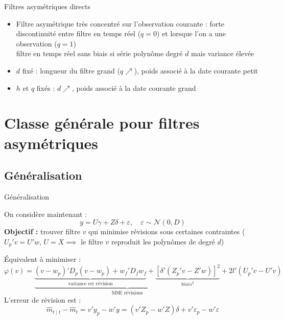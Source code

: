 \documentclass[10pt,xcolor=table,color={dvipsnames,usenames},ignorenonframetext,usepdftitle=false,french]{beamer}
\begin{document}
\begin{frame}{Filtres asymétriques directs}
\protect\hypertarget{filtres-asymuxe9triques-directs}{}

\begin{itemize}
\item
  Filtre asymétrique très concentré sur l'observation courante : forte
  discontinuité entre filtre en temps réel (\(q=0\)) et lorsque l'on a
  une observation (\(q=1\))\\
  \faArrowCircleRight{} filtre en temps réel sans biais si série
  polynôme degré \(d\) mais variance élevée \pause
\item
  \(d\) fixé : \faPlusCircle{} longueur du filtre grand (\(q\nearrow\)),
  \faPlusCircle{} poids associé à la date courante petit
\item
  \(h\) et \(q\) fixés : \faPlusCircle{} \(d\nearrow\), \faPlusCircle{}
  poids associé à la date courante grand
\end{itemize}

\end{frame}

\hypertarget{classe-guxe9nuxe9rale-pour-filtres-asymuxe9triques}{%
\section{Classe générale pour filtres
asymétriques}\label{classe-guxe9nuxe9rale-pour-filtres-asymuxe9triques}}

\hypertarget{guxe9nuxe9ralisation}{%
\subsection{Généralisation}\label{guxe9nuxe9ralisation}}

\begin{frame}{Généralisation}
\protect\hypertarget{guxe9nuxe9ralisation-1}{}

On considère maintenant : \[
y=U\gamma+Z\delta+\varepsilon,\quad
\varepsilon\sim\mathcal{N}(0,D)
\] \textbf{Objectif :} trouver filtre \(v\) qui minimise révisions sous
certaines contraintes (\(U_{p}'v=U'w\), \(U=X\implies\) le filtre \(v\)
reproduit les polynômes de degré \(d\))

Équivalent à minimiser : \[
\varphi(v)=
\underbrace{
  \underbrace{(v-w_{p})'D_{p}(v-w_{p})+
  w_{f}'D_{f}w_{f}}_\text{variance err révision}+
  \underbrace{[\delta'(Z_{p}'v-Z'w)]^{2}}_{biais^2}
}_\text{MSE révisions}+
2l'(U_{p}'v-U'v)
\] L'erreur de révision est : \[
\hat{m}_{t\mid t}-\hat{m}_{t}=v'y_{p}-w'y=(v'Z_{p}-w'Z)\delta+v'\varepsilon_{p}-w'\varepsilon
\]

\end{frame}
\end{document}
